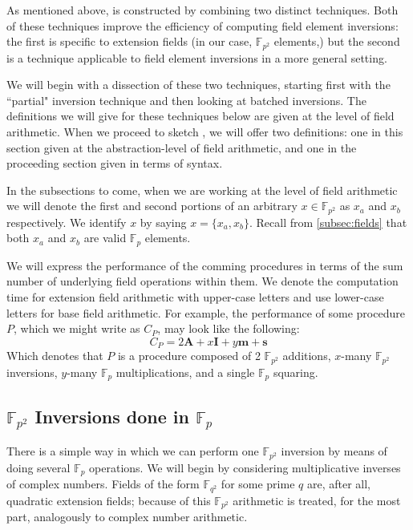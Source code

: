 As mentioned above,  is constructed by combining two distinct techniques. Both of these techniques improve the efficiency of computing field element inversions: the first is specific to extension fields (in our case, $\mathbb{F}_{p^{2}}$ elements,) but the second is a technique applicable to field element inversions in a more general setting.

We will begin with a dissection of these two techniques, starting first with the ``partial" inversion technique and then looking at batched inversions. The definitions we will give for these techniques below are given at the level of field arithmetic. When we proceed to sketch , we will offer two definitions: one in this section given at the abstraction-level of field arithmetic, and one in the proceeding section given in terms of \sidh syntax.

In the subsections to come, when we are working at the level of field arithmetic we will denote the first and second portions of an arbitrary $x \in \mathbb{F}_{p^{2}}$ as $x_{a}$ and $x_{b}$ respectively. We identify $x$ by saying $x = \{x_{a}, x_{b}\}$. Recall from \ref{subsec:fields} that both $x_{a}$ and $x_{b}$ are valid $\mathbb{F}_{p}$ elements. 

We will express the performance of the comming procedures in terms of the sum number of underlying field operations within them. We denote the computation time for extension field arithmetic with upper-case letters and use lower-case letters for base field arithmetic. For example, the performance of some procedure $P$, which we might write as $C_{P}$, may look like the following:
$$
C_{P} = 2\textbf{A} + x\textbf{I} + y\textbf{m} + \textbf{s}
$$
Which denotes that $P$ is a procedure composed of 2 $\mathbb{F}_{p^{2}}$ additions, $x$-many $\mathbb{F}_{p^{2}}$ inversions, $y$-many $\mathbb{F}_{p}$ multiplications, and a single $\mathbb{F}_{p}$ squaring. 

\subsection{$\mathbb{F}_{p^{2}}$ Inversions done in $\mathbb{F}_{p}$}

There is a simple way in which we can perform one $\mathbb{F}_{p^{2}}$ inversion by means of doing several $\mathbb{F}_{p}$ operations. We will begin by considering multiplicative inverses of complex numbers. Fields of the form $\mathbb{F}_{q^{2}}$ for some prime $q$ are, after all, quadratic extension fields; because of this $\mathbb{F}_{p^{2}}$ arithmetic is treated, for the most part, analogously to complex number arithmetic.

